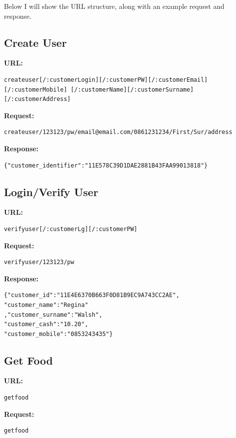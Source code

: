 Below I will show the URL structure, along with an example request and response.

\subsection*{Create User}
\textbf{URL:}
\begin{verbatim}
createuser[/:customerLogin][/:customerPW][/:customerEmail][/:customerMobile] [/:customerName][/:customerSurname][/:customerAddress]
\end{verbatim}

\textbf{Request:}
\begin{verbatim}
createuser/123123/pw/email@email.com/0861231234/First/Sur/address
\end{verbatim}

\textbf{Response:}
\begin{verbatim}
{"customer_identifier":"11E578C39D1DAE2881B43FAA99013818"}
\end{verbatim}

\subsection*{Login/Verify User}
\textbf{URL:}
\begin{verbatim}
verifyuser[/:customerLg][/:customerPW]
\end{verbatim}

\textbf{Request:}
\begin{verbatim}
verifyuser/123123/pw
\end{verbatim}

\textbf{Response:}
\begin{verbatim}
{"customer_id":"11E4E6370B663F0D81B9EC9A743CC2AE",
"customer_name":"Regina"
,"customer_surname":"Walsh",
"customer_cash":"10.20",
"customer_mobile":"0853243435"}
\end{verbatim}

\subsection*{Get Food}
\textbf{URL:}
\begin{verbatim}
getfood
\end{verbatim}

\textbf{Request:}
\begin{verbatim}
getfood
\end{verbatim}

